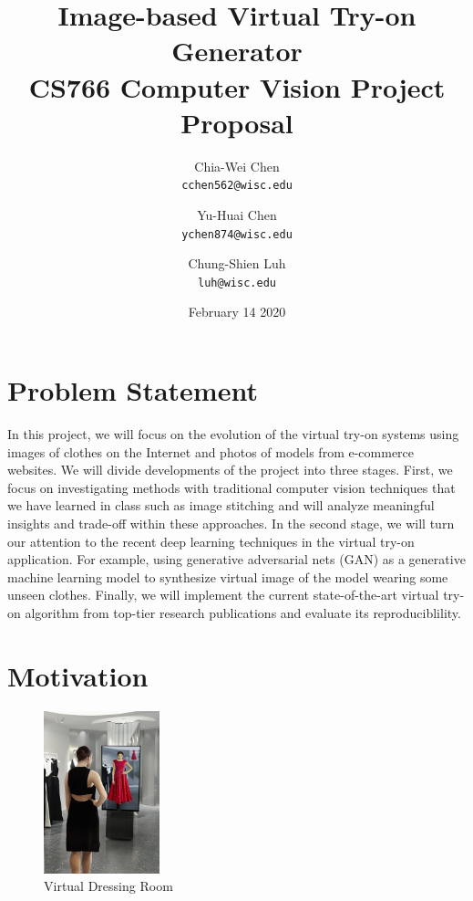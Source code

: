 \documentclass{article}
\date{February 14 2020}
\author{
  Chia-Wei Chen\\
  \texttt{cchen562@wisc.edu}
  \and
  Yu-Huai Chen\\
  \texttt{ychen874@wisc.edu}
  \and
  Chung-Shien Luh\\
  \texttt{luh@wisc.edu}
}
\title{
Image-based Virtual Try-on Generator\\
\large CS766 Computer Vision Project Proposal
}
\begin{document}
\maketitle

\section{Problem Statement}

In this project, we will focus on the evolution of the virtual try-on systems using images of clothes on the Internet and photos of models from e-commerce websites. We will divide developments of the project into three stages. First, we focus on investigating methods with traditional computer vision techniques that we have learned in class such as image stitching and will analyze meaningful insights and trade-off within these approaches. In the second stage, we will turn our attention to the recent deep learning techniques in the virtual try-on application. For example, using generative adversarial nets (GAN) \cite{goodfellow2014generative} as a generative machine learning model to synthesize virtual image of the model wearing some unseen clothes. Finally, we will implement the current state-of-the-art virtual try-on algorithm from top-tier research publications and evaluate its reproduciblility.


\section{Motivation}

\begin{figure}[h]
    \centering
    \includegraphics[width=0.3\textwidth]{fit-ar.jpg}
    \caption{Virtual Dressing Room \cite{vdr}}
\end{figure}
\end{document}
